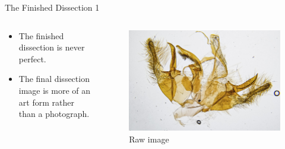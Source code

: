\documentclass[
  ignorenonframetext,
]{beamer}
\providecommand{\tightlist}{%
  \setlength{\itemsep}{0pt}\setlength{\parskip}{0pt}}
\begin{document}
\begin{frame}{The Finished Dissection 1}
\protect\hypertarget{the-finished-dissection-1}{}
\begin{columns}[T]
\begin{column}{0.5\textwidth}
\begin{itemize}
\tightlist
\item
  The finished dissection is never perfect.
\item
  The final dissection image is more of an art form rather than a
  photograph.
\end{itemize}
\end{column}

\begin{column}{0.5\textwidth}
\begin{figure}
\centering
\includegraphics{./images/PJP20220218-001-raw-dissection.jpg}
\caption{Raw image}
\end{figure}
\end{column}
\end{columns}
\end{frame}
\end{document}
